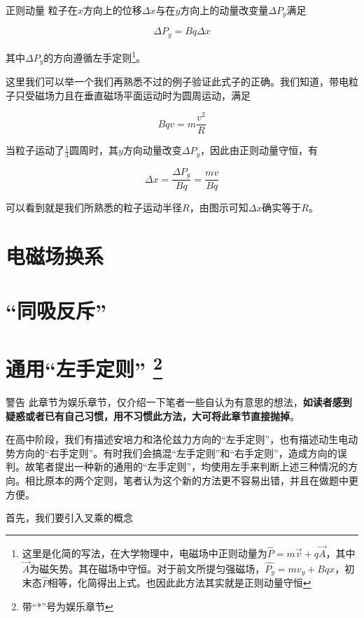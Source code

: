 \begin{theo}{正则动量}{}
粒子在$x$方向上的位移$\Delta x$与在$y$方向上的动量改变量$\Delta P_y$满足

$$\Delta P_y = B q \Delta x$$

其中$\Delta P_y$的方向遵循左手定则\footnote{这里是化简的写法，在大学物理中，电磁场中正则动量为$\hat{P} = m \vec{v} + q \vec{A}$，其中$\vec{A}$为磁矢势。其在磁场中守恒。对于前文所提匀强磁场，$\hat{P_y} = m v_y + B q x$，初末态$\hat{P}$相等，化简得出上式。也因此此方法其实就是正则动量守恒}。

\end{theo}

这里我们可以举一个我们再熟悉不过的例子验证此式子的正确。我们知道，带电粒子只受磁场力且在垂直磁场平面运动时为圆周运动，满足

$$B q v = m \frac{v^2}{R}$$

当粒子运动了$\frac{1}{4}$圆周时，其$y$方向动量改变$\Delta P_y$，因此由正则动量守恒，有

$$\Delta x = \frac{\Delta P_y}{B q} = \frac{m v}{B q}$$

可以看到就是我们所熟悉的粒子运动半径$R$，由图示可知$\Delta x$确实等于$R$。

\section{电磁场换系}

\section{“同吸反斥”}

\section{通用“左手定则” \quad * \protect  \footnote{带“*”号为娱乐章节}}

\begin{mk}{警告}{}
此章节为娱乐章节，仅介绍一下笔者一些自认为有意思的想法，\textbf{如读者感到疑惑或者已有自己习惯，用不习惯此方法，大可将此章节直接抛掉}。
\end{mk}

在高中阶段，我们有描述安培力和洛伦兹力方向的“左手定则”，也有描述动生电动势方向的“右手定则”。有时我们会搞混“左手定则”和“右手定则”，造成方向的误判。故笔者提出一种新的通用的“左手定则”，均使用左手来判断上述三种情况的方向。相比原本的两个定则，笔者认为这个新的方法更不容易出错，并且在做题中更方便。

首先，我们要引入叉乘的概念

